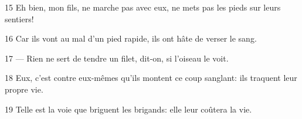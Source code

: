 
15 Eh bien, mon fils, ne marche pas avec eux, ne mets pas les pieds sur leurs sentiers!

16 Car ils vont au mal d’un pied rapide, ils ont hâte de verser le sang.

17 --- Rien ne sert de tendre un filet, dit-on, si l’oiseau le voit.

18 Eux, c’est contre eux-mêmes qu’ils montent ce coup sanglant: ils traquent leur propre vie.

19 Telle est la voie que briguent les brigands: elle leur coûtera la vie.